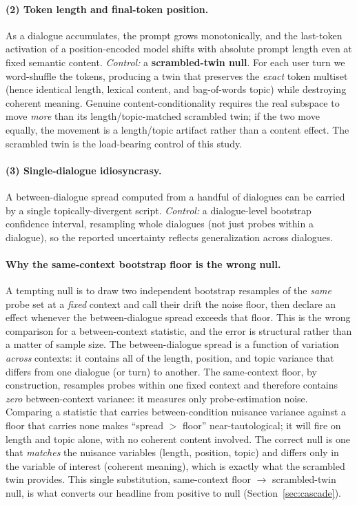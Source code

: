 \paragraph{(2) Token length and final-token position.} As a dialogue accumulates, the
prompt grows monotonically, and the last-token activation of a position-encoded model
shifts with absolute prompt length even at fixed semantic content. \emph{Control:} a
\textbf{scrambled-twin null}. For each user turn we word-shuffle the tokens, producing a
twin that preserves the \emph{exact} token multiset (hence identical length, lexical
content, and bag-of-words topic) while destroying coherent meaning. Genuine
content-conditionality requires the real subspace to move \emph{more} than its
length/topic-matched scrambled twin; if the two move equally, the movement is a length/topic
artifact rather than a content effect. The scrambled twin is the load-bearing control of
this study.

\paragraph{(3) Single-dialogue idiosyncrasy.} A between-dialogue spread computed from a
handful of dialogues can be carried by a single topically-divergent script.
\emph{Control:} a dialogue-level bootstrap confidence interval, resampling whole dialogues
(not just probes within a dialogue), so the reported uncertainty reflects generalization
across dialogues.

\paragraph{Why the same-context bootstrap floor is the wrong null.} A tempting null is to
draw two independent bootstrap resamples of the \emph{same} probe set at a \emph{fixed}
context and call their drift the noise floor, then declare an effect whenever the
between-dialogue spread exceeds that floor. This is the wrong comparison for a
between-context statistic, and the error is structural rather than a matter of sample size.
The between-dialogue spread is a function of variation \emph{across} contexts: it contains
all of the length, position, and topic variance that differs from one dialogue (or turn) to
another. The same-context floor, by construction, resamples probes within one fixed context
and therefore contains \emph{zero} between-context variance: it measures only
probe-estimation noise. Comparing a statistic that carries between-condition nuisance
variance against a floor that carries none makes ``spread $>$ floor'' near-tautological; it
will fire on length and topic alone, with no coherent content involved. The correct null is
one that \emph{matches} the nuisance variables (length, position, topic) and differs only in
the variable of interest (coherent meaning), which is exactly what the scrambled twin
provides. This single substitution, same-context floor $\rightarrow$ scrambled-twin null, is
what converts our headline from positive to null (Section~\ref{sec:cascade}).

